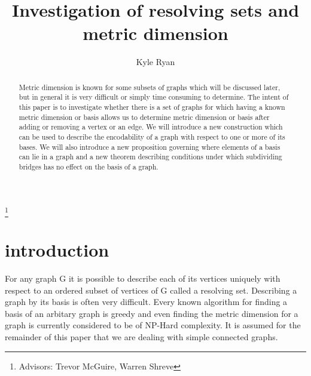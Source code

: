 \documentclass[11pt]{amsart}
\theoremstyle{plain}  %
\theoremstyle{definition}
\theoremstyle{remark}
\numberwithin{equation}{thm}
\begin{document}
\title[Investigation of resolving sets and metric dimension]{Investigation of resolving sets and metric dimension}
\author[K.~ R. Ryan]{Kyle Ryan}
\thanks{Advisors: Trevor McGuire, Warren Shreve}

\address{Department of Mathematics 2750\\ North Dakota State University\\PO BOX 6050\\ Fargo, ND 58108-6050\\ USA}


\maketitle


\begin{abstract}
        
        Metric dimension is known for some subsets of graphs which will be discussed later, but in general it is very difficult or simply time consuming to determine.
        The intent of this paper is to investigate whether there is a set of graphs for which having a known metric dimension or basis allows us to 
        determine metric dimension or basis after adding or removing a vertex or an edge. 
        We will introduce a new construction which can be used to describe the encodability of a graph with respect to one or more of its bases.
        We will also introduce a new proposition governing where elements of a basis can lie in a graph and a new theorem describing conditions under 
        which subdividing bridges has no effect on the basis of a graph.
\end{abstract}


\section{introduction}

    For any graph G it is possible to describe each of its vertices uniquely with respect to an ordered subset of vertices of G called a resolving set.
    Describing a graph by its basis is often very difficult. Every known algorithm for finding a basis of an arbitary graph is greedy and even 
    finding the metric dimension for a graph is currently considered to be of NP-Hard complexity. 
    It is assumed for the remainder of this paper that we are dealing with simple connected graphs.
    
\end{document}
